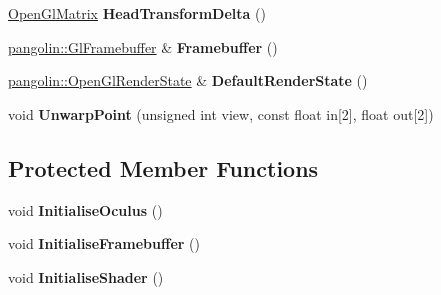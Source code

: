 \begin{DoxyCompactItemize}
\item 
\hyperlink{structpangolin_1_1_open_gl_matrix}{Open\+Gl\+Matrix} {\bfseries Head\+Transform\+Delta} ()\hypertarget{classpangolin_1_1_oculus_hud_a5c463962d92226e5b191ab2ae1267637}{}\label{classpangolin_1_1_oculus_hud_a5c463962d92226e5b191ab2ae1267637}

\item 
\hyperlink{structpangolin_1_1_gl_framebuffer}{pangolin\+::\+Gl\+Framebuffer} \& {\bfseries Framebuffer} ()\hypertarget{classpangolin_1_1_oculus_hud_af9a942e57b0dba2c94fd603e51c7cb2e}{}\label{classpangolin_1_1_oculus_hud_af9a942e57b0dba2c94fd603e51c7cb2e}

\item 
\hyperlink{classpangolin_1_1_open_gl_render_state}{pangolin\+::\+Open\+Gl\+Render\+State} \& {\bfseries Default\+Render\+State} ()\hypertarget{classpangolin_1_1_oculus_hud_a21047ecf09f66559c59bdad00eb27548}{}\label{classpangolin_1_1_oculus_hud_a21047ecf09f66559c59bdad00eb27548}

\item 
void {\bfseries Unwarp\+Point} (unsigned int view, const float in\mbox{[}2\mbox{]}, float out\mbox{[}2\mbox{]})\hypertarget{classpangolin_1_1_oculus_hud_a4472de0642895806dbfa535d0af7e644}{}\label{classpangolin_1_1_oculus_hud_a4472de0642895806dbfa535d0af7e644}

\end{DoxyCompactItemize}
\subsection*{Protected Member Functions}
\begin{DoxyCompactItemize}
\item 
void {\bfseries Initialise\+Oculus} ()\hypertarget{classpangolin_1_1_oculus_hud_ad161153f89a6bbfce769efa980585c4b}{}\label{classpangolin_1_1_oculus_hud_ad161153f89a6bbfce769efa980585c4b}

\item 
void {\bfseries Initialise\+Framebuffer} ()\hypertarget{classpangolin_1_1_oculus_hud_a937f73c34d008a976ef47f32dcd3d933}{}\label{classpangolin_1_1_oculus_hud_a937f73c34d008a976ef47f32dcd3d933}

\item 
void {\bfseries Initialise\+Shader} ()\hypertarget{classpangolin_1_1_oculus_hud_ace91affe6f6bbcfbae004e2fcbe27966}{}\label{classpangolin_1_1_oculus_hud_ace91affe6f6bbcfbae004e2fcbe27966}

\end{DoxyCompactItemize}
